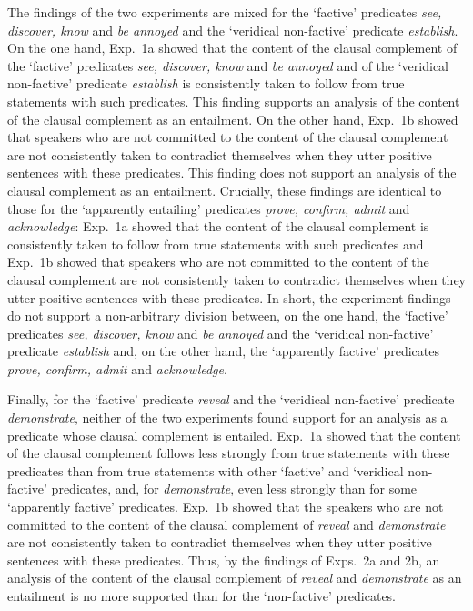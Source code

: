 \documentclass[11pt,fleqn]{article}
\newcommand{\6}{\mbox{$[\hspace*{-.6mm}[$}}
\newcommand{\9}{\mbox{$]\hspace*{-.6mm}]$}}
\begin{document}
{The findings of the two experiments are mixed for the `factive' predicates {\em see, discover, know} and {\em be annoyed} and the `veridical non-factive' predicate {\em establish}. On the one hand, Exp.~1a showed that the content of the clausal complement of the `factive' predicates {\em see, discover, know} and {\em be annoyed} and of the `veridical non-factive' predicate {\em establish} is consistently taken to follow from true statements with such predicates. This finding supports an analysis of the content of the clausal complement as an entailment. On the other hand, Exp.~1b showed that speakers who are not committed to the content of the clausal complement are not consistently taken to contradict themselves when they utter positive sentences with these predicates. This finding does not support an analysis of the clausal complement as an entailment. Crucially, these findings are identical to those for the `apparently entailing' predicates {\em prove, confirm, admit} and {\em acknowledge}: Exp.~1a showed that the content of the clausal complement is consistently taken to follow from true statements with such predicates and Exp.~1b showed that speakers who are not committed to the content of the clausal complement are not consistently taken to contradict themselves when they utter positive sentences with these predicates. In short, the experiment findings do not support a non-arbitrary division between, on the one hand, the  `factive' predicates {\em see, discover, know} and {\em be annoyed} and the `veridical non-factive' predicate {\em establish} and, on the other hand, the `apparently factive' predicates {\em prove, confirm, admit} and {\em acknowledge}.

Finally, for the `factive' predicate {\em reveal} and the `veridical non-factive' predicate {\em demonstrate}, neither of the two experiments found support for an analysis as a predicate whose clausal complement is entailed. Exp.~1a showed that the content of the clausal complement follows less strongly from true statements with these predicates than from true statements with other `factive' and `veridical non-factive' predicates, and, for {\em demonstrate}, even less strongly than for some `apparently factive' predicates. Exp.~1b showed that the speakers who are not committed to the content of the clausal complement  of {\em reveal} and {\em demonstrate} are not consistently taken to contradict themselves when they utter positive sentences with these predicates. Thus, by the findings of Exps.~2a and 2b, an analysis of the content of the clausal complement of {\em reveal} and {\em demonstrate} as an entailment is no more supported than for the `non-factive' predicates. 

}
\end{document}
